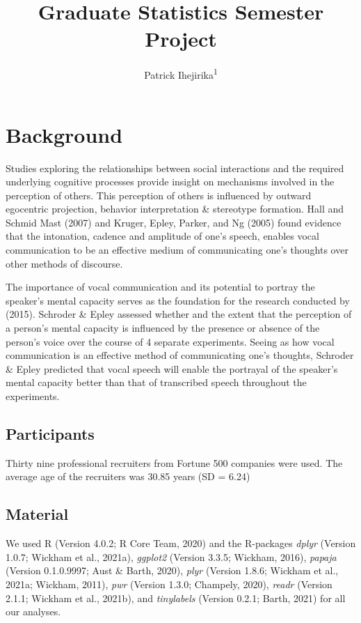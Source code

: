 \documentclass[
  english,
  man,floatsintext]{apa6}
\title{Graduate Statistics Semester Project}
\author{Patrick Ihejirika\textsuperscript{1}}
\date{}
\affiliation{\vspace{0.5cm}\textsuperscript{1} CUNY Brooklyn College}
\begin{document}
\maketitle

\hypertarget{background}{%
\section{Background}\label{background}}

Studies exploring the relationships between social interactions and the required underlying cognitive processes provide insight on mechanisms involved in the perception of others. This perception of others is influenced by outward egocentric projection, behavior interpretation \& stereotype formation. Hall and Schmid Mast (2007) and Kruger, Epley, Parker, and Ng (2005) found evidence that the intonation, cadence and amplitude of one's speech, enables vocal communication to be an effective medium of communicating one's thoughts over other methods of discourse.

The importance of vocal communication and its potential to portray the speaker's mental capacity serves as the foundation for the research conducted by (2015). Schroder \& Epley assessed whether and the extent that the perception of a person's mental capacity is influenced by the presence or absence of the person's voice over the course of 4 separate experiments. Seeing as how vocal communication is an effective method of communicating one's thoughts, Schroder \& Epley predicted that vocal speech will enable the portrayal of the speaker's mental capacity better than that of transcribed speech throughout the experiments.

\hypertarget{participants}{%
\subsection{Participants}\label{participants}}

Thirty nine professional recruiters from Fortune 500 companies were used. The average age of the recruiters was 30.85 years (SD = 6.24)

\hypertarget{material}{%
\subsection{Material}\label{material}}

We used R (Version 4.0.2; R Core Team, 2020) and the R-packages \emph{dplyr} (Version 1.0.7; Wickham et al., 2021a), \emph{ggplot2} (Version 3.3.5; Wickham, 2016), \emph{papaja} (Version 0.1.0.9997; Aust \& Barth, 2020), \emph{plyr} (Version 1.8.6; Wickham et al., 2021a; Wickham, 2011), \emph{pwr} (Version 1.3.0; Champely, 2020), \emph{readr} (Version 2.1.1; Wickham et al., 2021b), and \emph{tinylabels} (Version 0.2.1; Barth, 2021) for all our analyses.
\end{document}

